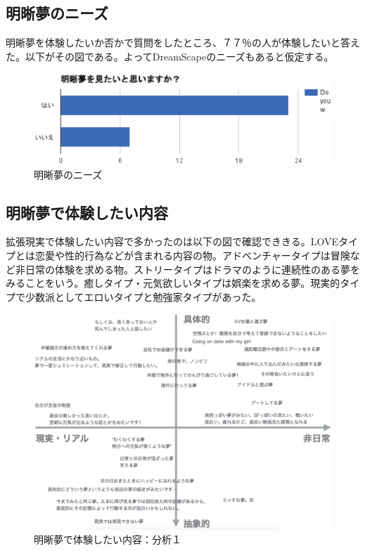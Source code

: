 \subsection{明晰夢のニーズ}
明晰夢を体験したいか否かで質問をしたところ、７７％の人が体験したいと答えた。以下がその図である。よってDreamScapeのニーズもあると仮定する。
\begin{figure}[htbp]
\begin{center}
\includegraphics[width=15cm]{eps/lucidDreamingYesNo.eps}
\caption{明晰夢のニーズ}
\label{明晰夢のニーズ}
\end{center}
\end{figure}

\subsection{明晰夢で体験したい内容}
拡張現実で体験したい内容で多かったのは以下の図で確認でききる。LOVEタイプとは恋愛や性的行為などが含まれる内容の物。アドベンチャータイプは冒険など非日常の体験を求める物。ストリータイプはドラマのように連続性のある夢をみることをいう。癒しタイプ・元気欲しいタイプは娯楽を求める夢。現実的タイプで少数派としてエロいタイプと勉強家タイプがあった。
\begin{figure}[htbp]
\begin{center}
\includegraphics[width=15cm]{eps/whatYouWantToDream.eps}
\caption{明晰夢で体験したい内容：分析１}
\label{明晰夢で体験したい内容：分析１}
\end{center}
\end{figure}

